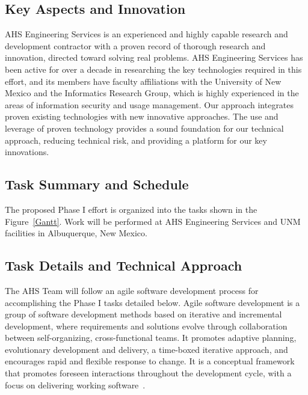 \documentclass{sbir}
\begin{document}
\subsection{Key Aspects and Innovation}
AHS Engineering Services is an experienced and highly capable research and development contractor with a proven record of thorough research and innovation, directed toward solving real problems. AHS Engineering Services has been active for over a decade in researching the key technologies required in this effort, and its members have faculty affiliations with the University of New Mexico and the Informatics Research Group, which is highly experienced in the areas of information security and usage management. Our approach integrates proven existing technologies with new innovative approaches. The use and leverage of proven technology provides a sound foundation for our technical approach, reducing technical risk, and providing a platform for our key innovations.

\subsection{Task Summary and Schedule}
The proposed Phase I effort is organized into the tasks shown in the Figure~\ref{Gantt}. Work will be performed at AHS Engineering Services and UNM facilities in Albuquerque, New Mexico.
\vspace{-0.1in}
\begin{center}
\end{center}

\subsection{Task Details and Technical Approach}
The AHS Team will follow an agile software development process for accomplishing the Phase I tasks detailed below. Agile software development is a group of software development methods based on iterative and incremental development, where requirements and solutions evolve through collaboration between self-organizing, cross-functional teams. It promotes adaptive planning, evolutionary development and delivery, a time-boxed iterative approach, and encourages rapid and flexible response to change. It is a conceptual framework that promotes foreseen interactions throughout the development cycle, with a focus on delivering working software~\cite{La:03}.
\end{document}

